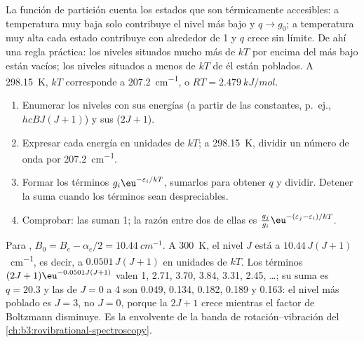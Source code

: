 La función de partición cuenta los estados que son térmicamente accesibles: a
temperatura muy baja solo contribuye el nivel más bajo y $q \to g_0$; a temperatura
muy alta cada estado contribuye con alrededor de 1 y $q$ crece sin límite.
De ahí una regla práctica: los niveles situados mucho más de $kT$ por encima del más bajo están
vacíos; los niveles situados a menos de $kT$ de él están poblados. A \qty{298.15}{K}, $kT$ corresponde
a \qty{207.2}{cm^{-1}}, o $RT = \qty{2.479}{kJ/mol}$.

\begin{method}\label{met:b3:partition-functions:populations}
\begin{enumerate}
  \item Enumerar los niveles con sus energías (a partir de las constantes, p.~ej.,
        $hcBJ(J+1)$) y sus  ($2J + 1$).
  \item Expresar cada energía en unidades de $kT$; a \qty{298.15}{K}, dividir un
        número de onda por \qty{207.2}{cm^{-1}}.
  \item Formar los términos $g_i\eu^{-\varepsilon_i/kT}$, sumarlos para obtener $q$ y dividir.
        Detener la suma cuando los términos sean despreciables.
  \item Comprobar: las  suman 1; la razón entre dos de ellas es
        $\frac{g_j}{g_i}\eu^{-(\varepsilon_j-\varepsilon_i)/kT}$.
\end{enumerate}
\end{method}

\begin{example}\label{ex:b3:partition-functions:hcl}
Para , $B_0 = B_e - \alpha_e/2 = \qty{10.44}{cm^{-1}}$. A \qty{300}{K}, el nivel $J$
está a $10.44\,J(J+1)$~\unit{cm^{-1}}, es decir, a $0.0501\,J(J+1)$ en unidades de $kT$. Los términos
$(2J+1)\eu^{-0.0501J(J+1)}$ valen 1, 2.71, 3.70, 3.84, 3.31, 2.45, \dots; su suma es
$q = 20.3$ y las  de $J = 0$ a 4 son 0.049, 0.134, 0.182, 0.189 y
0.163: el nivel más poblado es $J = 3$, no $J = 0$, porque la 
$2J + 1$ crece mientras el factor de Boltzmann disminuye. Es la envolvente de la
banda de rotación--vibración del \cref{ch:b3:rovibrational-spectroscopy}.
\end{example}

